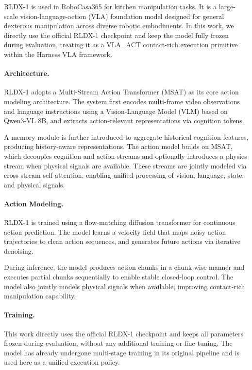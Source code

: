 \documentclass{article}
\begin{document}
RLDX-1 is used in RoboCasa365 for kitchen manipulation tasks. It is a large-scale vision-language-action (VLA) foundation model designed for general dexterous manipulation across diverse robotic embodiments. In this work, we directly use the official RLDX-1 checkpoint and keep the model fully frozen during evaluation, treating it as a VLA\_ACT contact-rich execution primitive within the Harness VLA framework.

\paragraph{Architecture.}
RLDX-1 adopts a Multi-Stream Action Transformer (MSAT) as its core action modeling architecture. The system first encodes multi-frame video observations and language instructions using a Vision-Language Model (VLM) based on Qwen3-VL 8B, and extracts action-relevant representations via cognition tokens.

A memory module is further introduced to aggregate historical cognition features, producing history-aware representations. The action model builds on MSAT, which decouples cognition and action streams and optionally introduces a physics stream when physical signals are available. These streams are jointly modeled via cross-stream self-attention, enabling unified processing of vision, language, state, and physical signals.

\paragraph{Action Modeling.}
RLDX-1 is trained using a flow-matching diffusion transformer for continuous action prediction. The model learns a velocity field that maps noisy action trajectories to clean action sequences, and generates future actions via iterative denoising.

During inference, the model produces action chunks in a chunk-wise manner and executes partial chunks sequentially to enable stable closed-loop control. The model also jointly models physical signals when available, improving contact-rich manipulation capability.

\paragraph{Training.}
This work directly uses the official RLDX-1 checkpoint and keeps all parameters frozen during evaluation, without any additional training or fine-tuning. The model has already undergone multi-stage training in its original pipeline and is used here as a unified execution policy.
\end{document}
